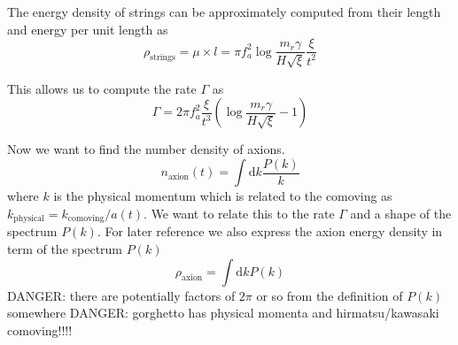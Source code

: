 \documentclass[a4paper]{article}
\begin{document}
The energy density of strings can be approximately computed from their length and energy per unit length as
\begin{equation}
	\rho_\mathrm{strings} = \mu \times l = \pi f_a^2 \log \frac{m_r \gamma}{H \sqrt{\xi}} \frac{\xi}{t^2}
\end{equation}

This allows us to compute the rate $\Gamma$ as 
\begin{equation}
	\Gamma = 2 \pi f_a^2 \frac{\xi}{t^3} \left( \log \frac{m_r \gamma}{H \sqrt{\xi}} - 1  \right)
\end{equation}

Now we want to find the number density of axions.
\begin{equation}
	\label{eq:number_density_from_spectrum}
	n_\mathrm{axion}(t) = \int \mathrm{d} k \frac{P(k)}{k} 
\end{equation}
where $k$ is the physical momentum which is related to the comoving as $k_\mathrm{physical} = k_\mathrm{comoving} / a(t)$.
We want to relate this to the rate $\Gamma$ and a shape of the spectrum $P(k)$.
For later reference we also express the axion energy density in term of the spectrum $P(k)$
\begin{equation}
	\rho_\mathrm{axion}  = \int \mathrm{d} k P(k)
\end{equation}
DANGER: there are potentially factors of $2\pi$ or so from the definition of $P(k)$ somewhere 
DANGER: gorghetto has physical momenta and hirmatsu/kawasaki comoving!!!!
\end{document}
